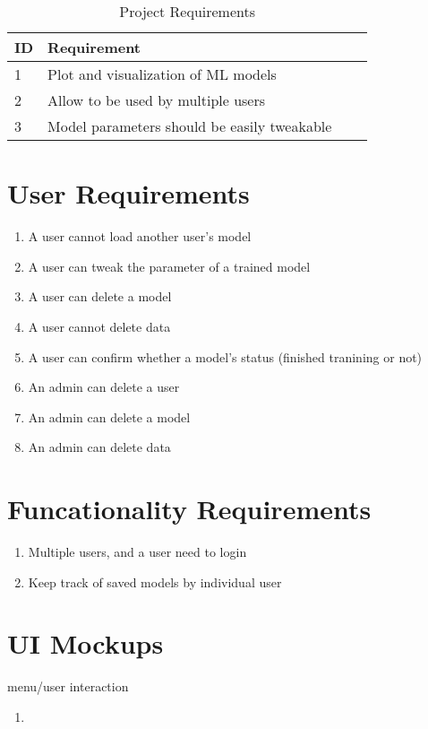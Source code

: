 \documentclass[11pt]{article}
\begin{document}
\begin{table}[htb]
 \small
 \centering
  \begin{tabular}{|l|l|l|l|}
  \hline
  \bf ID & \bf Requirement\\ \hline
       1 & Plot and visualization of ML models\\
       2 & Allow to be used by multiple users \\
       3 & Model parameters should be easily tweakable \\
  \hline
  \end{tabular}
 \caption{Project Requirements} 
\end{table}



\section{User Requirements}
\begin{enumerate}[leftmargin=4\parindent,itemsep=-1ex]
 \item A user cannot load another user's model
 \item A user can tweak the parameter of a trained model
 \item A user can delete a model
 \item A user cannot delete data
 \item A user can confirm whether a model's status (finished tranining or not)
 \item An admin can delete a user
 \item An admin can delete a model
 \item An admin can delete data
\end{enumerate}

\section{Funcationality Requirements}
\begin{enumerate}[leftmargin=4\parindent,itemsep=-1ex]
 \item Multiple users, and a user need to login
 \item Keep track of saved models by individual user
\end{enumerate}

\section{UI Mockups}
menu/user interaction
\begin{enumerate}[leftmargin=4\parindent,itemsep=-1ex]
 \item 
\end{enumerate}
\end{document}
